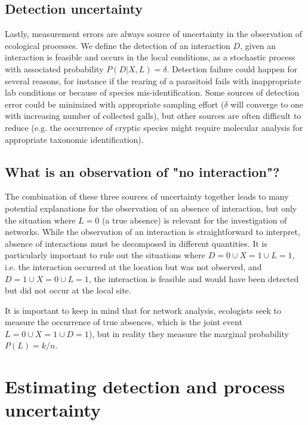 ﻿\documentclass[12pt]{article}
\begin{document}
    \subsection*{Detection uncertainty} 

    Lastly, measurement errors are always source of uncertainty in the observation of ecological processes. We define the detection of an interaction $D$, given an interaction is feasible and occurs in the local conditions, as a stochastic process with associated probability $P(D|X,L)=\delta$. Detection failure could happen for several reasons, for instance if the rearing of a parasitoid fails with inappropriate lab conditions or because of species mis-identification. Some sources of detection error could be minimized with appropriate sampling effort ($\delta$ will converge to one with increasing number of collected galls), but other sources are often difficult to reduce (e.g. the occurrence of cryptic species might require molecular analysis for appropriate taxonomic identification).


    \subsection*{What is an observation of "no interaction"?} 

    The combination of these three sources of uncertainty together leads to many potential explanations for the observation of an absence of interaction, but only the situation where $L = 0$ (a true absence) is relevant for the investigation of networks. While the observation of an interaction is straightforward to interpret, absence of interactions must be decomposed in different quantities. It is particularly important to rule out the situations where $D=0 \cup X = 1 \cup L=1$, i.e. the interaction occurred at the location but was not observed, and $D=1 \cup X = 0 \cup L =1$, the interaction is feasible and would have been detected but did not occur at the local site. 


  It is important to keep in mind that for network analysis, ecologists seek to measure the occurrence of true absences, which is the joint event $L=0 \cup X=1 \cup D=1$), but in reality they measure the marginal probability $P(L) = k/n$. %


\section*{Estimating detection and process uncertainty}
\end{document}
